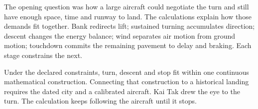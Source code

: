 The opening question was how a large aircraft could negotiate the turn and still have enough space, time and runway to land. The calculations explain how those demands fit together. Bank redirects lift; sustained turning accumulates direction; descent changes the energy balance; wind separates air motion from ground motion; touchdown commits the remaining pavement to delay and braking. Each stage constrains the next.

Under the declared constraints, turn, descent and stop fit within one continuous mathematical construction. Connecting that construction to a historical landing requires the dated city and a calibrated aircraft. Kai Tak drew the eye to the turn. The calculation keeps following the aircraft until it stops.
